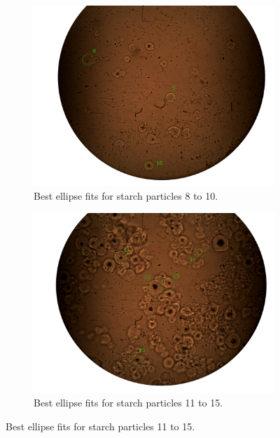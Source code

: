\begin{figure}[h!]
    \medskip
    \begin{subfigure}[b]{0.475\textwidth}
        \centering
        \includegraphics[width=\textwidth]{afbeeldingen/size/zetmeel/zetmeel_3.png}
        \caption{Best ellipse fits for starch particles 8 to 10.}   
        \label{fig_zetmeel_3}
    \end{subfigure}
    \hspace*{\fill}
    \begin{subfigure}[b]{0.475\textwidth}
        \centering
        \includegraphics[width=\textwidth]{afbeeldingen/size/zetmeel/zetmeel_4.png}
        \caption{Best ellipse fits for starch particles 11 to 15.}   
        \label{fig_zetmeel_4}
    \end{subfigure}
    

\end{figure}
